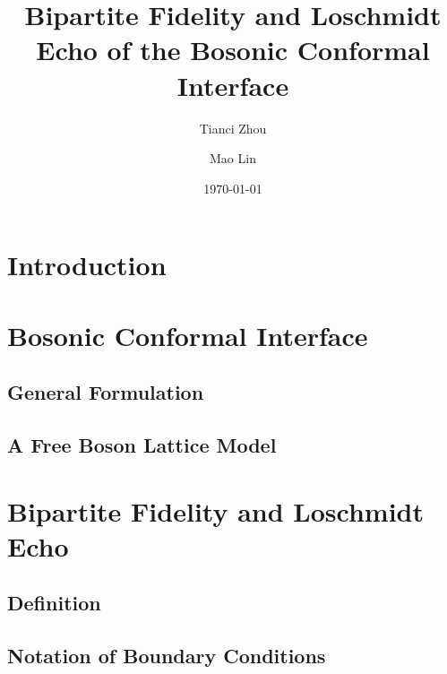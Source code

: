 \documentclass[reprint, prb]{revtex4-1}
\begin{document}
\title{Bipartite Fidelity and Loschmidt Echo of the Bosonic Conformal Interface}
 
\author{Tianci Zhou}

\author{Mao Lin}

\date{\today}

\begin{abstract}

\end{abstract}

\maketitle

\section{Introduction}


\section{Bosonic Conformal Interface}
\label{sec:bosonic_conformal_interface}

\subsection{General Formulation}
\label{sec_sub:general_formulation}


\subsection{A Free Boson Lattice Model}
\label{sec_sub:free_boson_lattice}


\section{Bipartite Fidelity and Loschmidt Echo}
\label{sec:analytic_numerics}

\subsection{Definition}


\subsection{Notation of Boundary Conditions}
\label{sec:notation}

\end{document}
